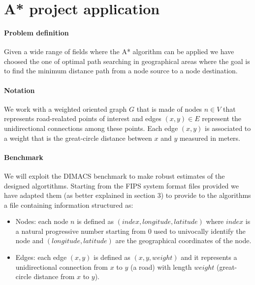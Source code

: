 \documentclass[twocolumn, switch]{article} %
\begin{document}
\section{A* project application}
\paragraph{Problem definition} Given a wide range of fields where the A* algorithm can be applied we have choosed the one of
optimal path searching in geographical areas where the goal is to find the minimum distance path from a 
node source to a node destination.

\paragraph{Notation} We work with a weighted oriented graph $G$ that is made of nodes $n \in V$ that represents
road-realated points of interest and edges $(x,y) \in E$ represent the unidirectional connections among these points.
Each edge $(x, y)$ is associated to a weight that is the great-circle distance between $x$ and $y$ measured
in meters.
\paragraph{Benchmark} We will exploit the DIMACS benchmark to make robust estimates of the designed algortithms.
Starting from the FIPS system format files provided we have adapted them (as better explained in section 3) to provide
to the algorithms a file containing information structured as:
\begin{itemize}
  \item Nodes: each node $n$ is defined as $(index, longitude, latitude)$ where $index$ is a natural progressive
        number starting from $0$ used to univocally identify the node and $(longitude, latitude)$ are the geographical
        coordinates of the node.
  \item Edges: each edge $(x, y)$ is defined as $(x, y, weight)$ and it represents a unidirectional connection
        from $x$ to $y$ (a road) with length $weight$ (great-circle distance from $x$ to $y$).
\end{itemize}
\end{document}
